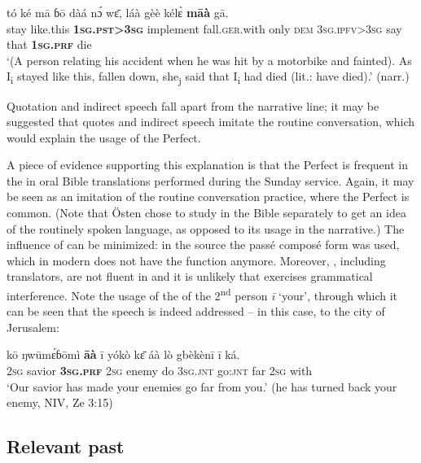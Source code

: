 \documentclass[output=paper,newtxmath,modfonts,nonflat,hidelinks]{langsci/langscibook}
\begin{document}
\begin{exe} \ex
\label{khachexquot2}
\gll 	tó	ké	mā	ɓō	dàá	nɔ́	wɛ̄, láà	gèè	kélɛ̀	\textbf{māà}	gā.		\\
	stay	like.this	\textbf{1\textsc{sg}.\textsc{pst}>3\textsc{sg}}	implement fall.\textsc{ger}.with	only	\textsc{dem}	3\textsc{sg}.\textsc{ipfv}>3\textsc{sg}	say	that	\textbf{1\textsc{sg}.\textsc{prf}}	die\\
\glt ‘(A person relating his accident when he was hit by a motorbike and fainted). As I\textsubscript{i} stayed like this, fallen down, she\textsubscript{j} said that I\textsubscript{i} had died (lit.: have died).’ (narr.)
\end{exe}

Quotation and indirect speech fall apart from the narrative line; it may be suggested that quotes and indirect speech imitate the routine conversation, which would explain the usage of the Perfect. 

A piece of evidence supporting this explanation is that the Perfect is frequent in the  in oral Bible translations performed during the Sunday service. Again, it may be seen as an imitation of the routine conversation practice, where the Perfect is common. (Note that Östen \citet{khachdahl2014} chose to study  in the Bible separately to get an idea of the routinely spoken language, as opposed to its usage in the narrative.) The influence of  can be minimized: in the  source the passé composé form was used, which in modern  does not have the  function anymore. Moreover, , including  translators, are not fluent in  and it is unlikely that  exercises grammatical interference. Note the usage of the  of the 2\textsuperscript{nd} person \textit{ī} `your', through which it can be seen that the speech is indeed addressed -- in this case, to the city of Jerusalem:

\begin{exe}\ex
\gll kō ŋwūmɛ́ɓōmì \textbf{āà} ī yókò kɛ̄ áà lò gbèkènī ī ká.\\
\textsc{2sg} savior \textbf{\textsc{3sg.prf}} \textsc{2sg} enemy do \textsc{3sg.jnt} go:\textsc{jnt} far \textsc{2sg} with\\
\glt `Our savior has made your enemies go far from you.' (he has turned back your enemy, NIV, Ze 3:15)
\end{exe}


\subsection{Relevant past}
\end{document}
